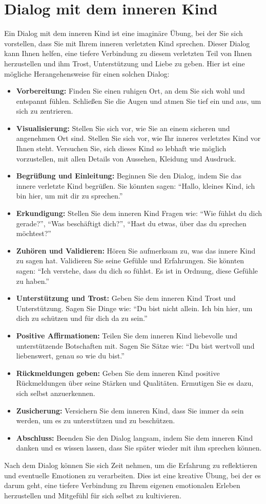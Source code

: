 \section{Dialog mit dem inneren Kind}

Ein Dialog mit dem inneren Kind ist eine imaginäre Übung, bei der Sie sich vorstellen, dass Sie mit Ihrem inneren verletzten Kind sprechen. Dieser Dialog kann Ihnen helfen, eine tiefere Verbindung zu diesem verletzten Teil von Ihnen herzustellen und ihm Trost, Unterstützung und Liebe zu geben. Hier ist eine mögliche Herangehensweise für einen solchen Dialog:
\begin{itemize}
    
    \item \textbf{Vorbereitung:} Finden Sie einen ruhigen Ort, an dem Sie sich wohl und entspannt fühlen. Schließen Sie die Augen und atmen Sie tief ein und aus, um sich zu zentrieren.
    \item \textbf{Visualisierung:} Stellen Sie sich vor, wie Sie an einem sicheren und angenehmen Ort sind. Stellen Sie sich vor, wie Ihr inneres verletztes Kind vor Ihnen steht. Versuchen Sie, sich dieses Kind so lebhaft wie möglich vorzustellen, mit allen Details von Aussehen, Kleidung und Ausdruck.
    \item \textbf{Begrüßung und Einleitung:} Beginnen Sie den Dialog, indem Sie das innere verletzte Kind begrüßen. Sie könnten sagen: \enquote{Hallo, kleines Kind, ich bin hier, um mit dir zu sprechen.}
    \item \textbf{Erkundigung:} Stellen Sie dem inneren Kind Fragen wie: \enquote{Wie fühlst du dich gerade?}, \enquote{Was beschäftigt dich?}, \enquote{Hast du etwas, über das du sprechen möchtest?} 
    \item \textbf{Zuhören und Validieren:} Hören Sie aufmerksam zu, was das innere Kind zu sagen hat. Validieren Sie seine Gefühle und Erfahrungen. Sie könnten sagen: \enquote{Ich verstehe, dass du dich so fühlst. Es ist in Ordnung, diese Gefühle zu haben.}
    \item \textbf{Unterstützung und Trost:} Geben Sie dem inneren Kind Trost und Unterstützung. Sagen Sie Dinge wie: \enquote{Du bist nicht allein. Ich bin hier, um dich zu schützen und für dich da zu sein.}
    \item \textbf{Positive Affirmationen:} Teilen Sie dem inneren Kind liebevolle und unterstützende Botschaften mit. Sagen Sie Sätze wie: \enquote{Du bist wertvoll und liebenswert, genau so wie du bist.}
    \item \textbf{Rückmeldungen geben:} Geben Sie dem inneren Kind positive Rückmeldungen über seine Stärken und Qualitäten. Ermutigen Sie es dazu, sich selbst anzuerkennen.
    \item \textbf{Zusicherung:} Versichern Sie dem inneren Kind, dass Sie immer da sein werden, um es zu unterstützen und zu beschützen.
    \item \textbf{Abschluss:} Beenden Sie den Dialog langsam, indem Sie dem inneren Kind danken und es wissen lassen, dass Sie später wieder mit ihm sprechen können.
\end{itemize}
%
Nach dem Dialog können Sie sich Zeit nehmen, um die Erfahrung zu reflektieren und eventuelle Emotionen zu verarbeiten. Dies ist eine kreative Übung, bei der es darum geht, eine tiefere Verbindung zu Ihrem eigenen emotionalen Erleben herzustellen und Mitgefühl für sich selbst zu kultivieren.



